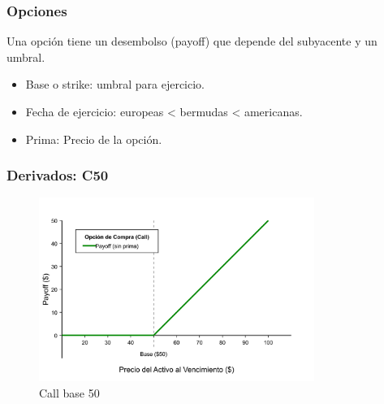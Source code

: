 \begin{frame}
    \frametitle{Opciones}
    \begin{defin}[Opcion]
        Una opción tiene un desembolso (payoff) que depende del subyacente y un umbral.\\
        \begin{itemize}
            \item Base o strike: umbral para ejercicio.
            \item Fecha de ejercicio: europeas < bermudas < americanas.
            \item Prima: Precio de la opción.
        \end{itemize}
    \end{defin}
\end{frame}


\begin{frame}
    \frametitle{Derivados: C50}
    \begin{figure}[h]
       \centering
       \includegraphics[width=0.8\textwidth]{img/cap1/call50.jpg}
       \caption{Call base 50}
       \label{Call50}
    \end{figure}
\end{frame}


